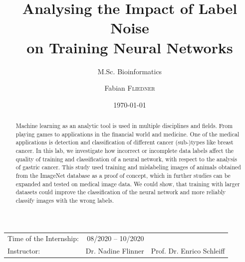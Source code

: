 \documentclass[a4paper,11pt]{scrartcl}
\title{Analysing the Impact of Label Noise\\on Training Neural Networks} %
\subtitle{M.Sc. Bioinformatics}
\author{Fabian \textsc{Fliedner}} %
\date{\today} %
\theoremstyle{definition}
\begin{document}
\maketitle %
\begin{center}
\begin{tabular}{l r r}
Time of the Internship: & 08/2020 -- 10/2020& \\ %
Instructor: & Dr. Nadine Flinner & Prof. Dr. Enrico Schleiff %
\end{tabular}
\end{center}
\newpage
\tableofcontents
\listoffigures
\listoftables
\newpage

\begin{abstract}
	Machine learning as an analytic tool is used in multiple disciplines and fields.
	From playing games to applications in the financial world and medicine.
	One of the medical applications is detection and classification of different cancer (sub-)types like breast cancer.
	In this lab, we investigate how incorrect or incomplete data labels affect the quality of training and classification of a neural network, with respect to the analysis of gastric cancer.
	This study used training and mislabeling images of animals obtained from the ImageNet database as a proof of concept, which in further studies can be expanded and tested on medical image data.
	We could show, that training with larger datasets could improve the classification of the neural network and more reliably classify images with the wrong labels.
\end{abstract}
\end{document}
